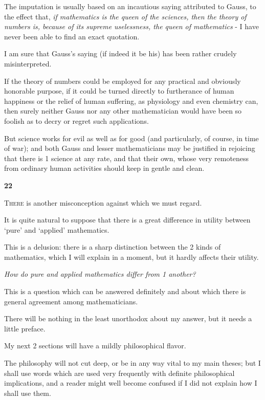 \documentclass{article}
\numberwithin{equation}{section}
\begin{document}
The imputation is usually based on an incautious saying attributed to Gauss, to the effect that, \textit{if mathematics is the queen of the sciences, then the theory of numbers is, because of its supreme uselessness, the queen of mathematics} - I have never been able to find an exact quotation.

I am sure that Gauss's saying (if indeed it be his) has been rather crudely misinterpreted.

If the theory of numbers could be employed for any practical and obviously honorable purpose, if it could be turned directly to furtherance of human happiness or the relief of human suffering, as physiology and even chemistry can, then surely neither Gauss nor any other mathematician would have been so foolish as to decry or regret such applications.

But science works for evil as well as for good (and particularly, of course, in time of war); and both Gauss and lesser mathematicians may be justified in rejoicing that there is 1 science at any rate, and that their own, whose very remoteness from ordinary human activities should keep in gentle and clean.

\begin{center}
    \large\textbf{22}
\end{center}
\textsc{There} is another misconception against which we must regard.

It is quite natural to suppose that there is a great difference in utility between `pure' and `applied' mathematics.

This is a delusion: there is a sharp distinction between the 2 kinds of mathematics, which I will explain in a moment, but it hardly affects their utility.

%
\textit{How do pure and applied mathematics differ from 1 another?}

This is a question which can be answered definitely and about which there is general agreement among mathematicians.

There will be nothing in the least unorthodox about my answer, but it needs a little preface.

%
My next 2 sections will have a mildly philosophical flavor.

The philosophy will not cut deep, or be in any way vital to my main theses; but I shall use words which are used very frequently with definite philosophical implications, and a reader might well become confused if I did not explain how I shall use them.
\end{document}
